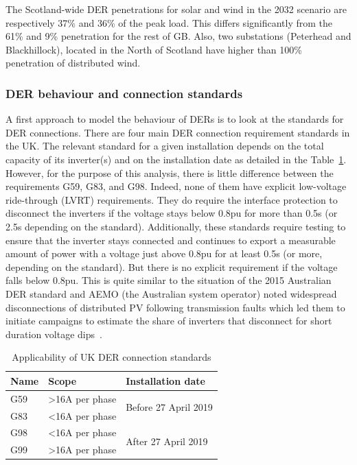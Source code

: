 The Scotland-wide DER penetrations for solar and wind in the 2032 scenario are respectively 37\% and 36\% of the peak load. This differs significantly from the 61\% and 9\% penetration for the rest of GB. Also, two substations (Peterhead and Blackhillock), located in the North of Scotland have higher than 100\% penetration of distributed wind.



\subsubsection{DER behaviour and connection standards}

A first approach to model the behaviour of DERs is to look at the standards for DER connections. There are four main DER connection requirement standards in the UK. The relevant standard for a given installation depends on the total capacity of its inverter(s) and on the installation date as detailed in the Table~\ref{tab:UK_standards}. However, for the purpose of this analysis, there is little difference between the requirements G59, G83, and G98. Indeed, none of them have explicit low-voltage ride-through (LVRT) requirements. They do require the interface protection to disconnect the inverters if the voltage stays below 0.8pu for more than 0.5s (or 2.5s depending on the standard).  Additionally, these standards require testing to ensure that the inverter stays connected and continues to export a measurable amount of power with a voltage just above 0.8pu for at least 0.5s (or more, depending on the standard). But there is no explicit requirement if the voltage falls below 0.8pu. This is quite similar to the situation of the 2015 Australian DER standard and AEMO (the Australian system operator) noted widespread disconnections of distributed PV following transmission faults which led them to initiate campaigns to estimate the share of inverters that disconnect for short duration voltage dips~\cite{aemo_short_duration, aemo_behaviour_2021}.

\begin{table}
\centering
\caption{Applicability of UK DER connection standards}
\label{tab:UK_standards}
\begin{tabular}{@{}lll@{}}
\toprule
Name & Scope           & Installation date                     \\ \midrule
G59~\cite{G59}  & \textgreater 16A per phase & \multirow{2}{*}{Before 27 April 2019} \\
G83~\cite{G83}  & \textless 16A per phase &                                       \\
G98~\cite{G98}  & \textless 16A per phase & \multirow{2}{*}{After 27 April 2019}  \\
G99~\cite{G99}  & \textgreater 16A per phase &                                       \\ \bottomrule
\end{tabular}
\end{table}

